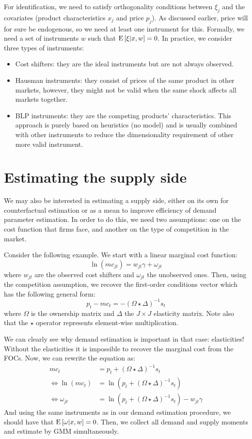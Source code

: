 For identification, we need to satisfy orthogonality conditions between $\xi_j$ and the covariates (product characteristics $x_j$ and price $p_j$). As discussed earlier, price will for sure be endogenous, so we need at least one instrument for this. Formally, we need a set of instruments $w$ such that $\operatorname{E}\left[\xi|x, w\right] = 0$.  In practice, we consider three types of instruments:\begin{itemize}
\item Cost shifters: they are the ideal instruments but are not always observed.
\item Hausman instruments: they consist of prices of the same product in other markets, however, they might not be valid when the same shock affects all markets together.
\item BLP instruments: they are the competing products' characteristics. This approach is purely based on heuristics (no model) and is usually combined with other instruments to reduce the dimensionality requirement of other more valid instrument.
\end{itemize}

\section{Estimating the supply side}\label{sec:supplyside}

We may also be interested in estimating a supply side, either on its own for counterfactual estimation or as a mean to improve efficiency of demand parameter estimation. In order to do this, we need two assumptions: one on the cost function that firms face, and another on the type of competition in the market.

Consider the following example. We start with a linear marginal cost function: $$\ln(mc_{jt}) = w_{jt}\gamma + \omega_{jt} $$ where $w_{jt}$ are the observed cost shifters and $\omega_{jt}$ the unobserved ones. Then, using the competition assumption, we recover the first-order conditions vector which has the following general form: $$ p_t - mc_t = - (\Omega \star \Delta)^{-1} s_t $$ where $\Omega$ is the ownership matrix and $\Delta$ the $J\times J$ elasticity matrix. Note also that the $\star$ operator represents element-wise multiplication.

We can clearly see why demand estimation is important in that case: elasticities! Without the elasticities it is impossible to recover the marginal cost from the FOCs. Now, we can rewrite the equation as: \begin{align*}
mc_t  & = p_t + (\Omega \star \Delta)^{-1} s_t \\
 \Leftrightarrow \ln(mc_t) & = \ln(p_t + (\Omega \star \Delta)^{-1} s_t) \\ \Leftrightarrow \omega_{jt} & = \ln(p_t + (\Omega \star \Delta)^{-1} s_t) - w_{jt}\gamma
\end{align*} 
And using the same instruments as in our demand estimation procedure, we should have that $\operatorname{E}\left[\omega|x, w\right] = 0$. Then, we collect all demand and supply moments and estimate by GMM simultaneously.

